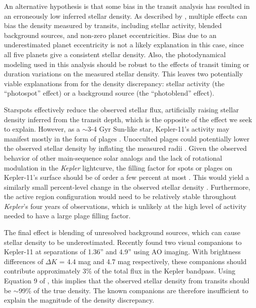 \documentclass[twocolumn]{aastex61}
\newcommand{\Kepler}{\textit{Kepler} }
\begin{document}
An alternative hypothesis is that some bias in the transit analysis has resulted in an erroneously low inferred stellar density. As described by \citet{Kipping2014}, multiple effects can bias the density measured by transits, including stellar activity, blended background sources, and non-zero planet eccentricities. Bias due to an underestimated planet eccentricity is not a likely explanation in this case, since all five planets give a consistent stellar density. Also, the photodynamical modeling used in this analysis should be robust to the effects of transit timing or duration variations on the measured stellar density. This leaves two potentially viable explanations from \citet{Kipping2014} for the density discrepancy: stellar activity (the ``photospot'' effect) or a background source (the ``photoblend'' effect).

Starspots effectively reduce the observed stellar flux, artificially raising stellar density inferred from the transit depth, which is the opposite of the effect we seek to explain. However, as a $\sim$3-4 Gyr Sun-like star, Kepler-11's activity may manifest mostly in the form of plages \citep{Radick1998}. Unocculted plages could potentially lower the observed stellar density by inflating the measured radii \citep{Oshagh2014}. Given the observed behavior of other main-sequence solar analogs and the lack of rotational modulation in the \Kepler lightcurve, the filling factor for spots or plages on Kepler-11's surface should be of order a few percent at most \citep{Meunier2010}. This would yield a similarly small percent-level change in the observed stellar density \citep{Kipping2014}. Furthermore, the active region configuration would need to be relatively stable throughout \textit{Kepler}'s four years of observations, which is unlikely at the high level of activity needed to have a large plage filling factor.

The final effect is blending of unresolved background sources, which can cause stellar density to be underestimated. Recently \citet{Wang2015} found two visual companions to Kepler-11 at separations of 1.36'' and 4.9'' using AO imaging. With brightness differences of $\Delta K$ = 4.4 mag and 4.7 mag respectively, these companions should contribute approximately 3\% of the total flux in the Kepler bandpass. Using Equation 9 of \citet{Kipping2014}, this implies that the observed stellar density from transits should be $\sim$99\% of the true density. The known companions are therefore insufficient to explain the magnitude of the density discrepancy.
\end{document}
